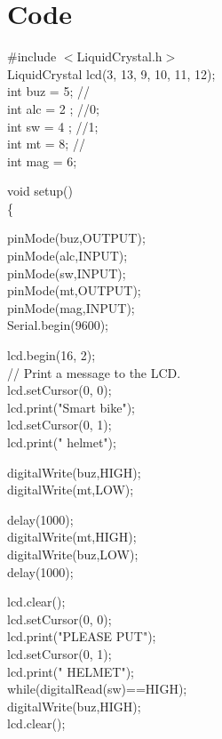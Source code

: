 \pagebreak
\section{Code}
\#include $<$LiquidCrystal.h$>$\\
LiquidCrystal lcd(3, 13, 9, 10, 11, 12);\\
int buz = 5;  // \\
int alc = 2 ; //0;\\
int sw =  4 ; //1;\\
int mt = 8;   //\\
int mag = 6;\\
\vspace{.3cm}

void setup()\\
\{ \vspace{.3cm}

pinMode(buz,OUTPUT);\\
pinMode(alc,INPUT);\\
pinMode(sw,INPUT);\\
pinMode(mt,OUTPUT);\\
pinMode(mag,INPUT);\\
Serial.begin(9600);\\
\vspace{.3cm}

lcd.begin(16, 2);\\
// Print a message to the LCD.\\
lcd.setCursor(0, 0);\\
lcd.print("Smart bike");\\
lcd.setCursor(0, 1);\\
lcd.print("   helmet");\\
\vspace{.6cm}


digitalWrite(buz,HIGH);\\
digitalWrite(mt,LOW);\\
\vspace{.3cm}

delay(1000);\\
digitalWrite(mt,HIGH);\\
digitalWrite(buz,LOW);\\
delay(1000);\\
\vspace{.3cm}

lcd.clear();\\
lcd.setCursor(0, 0);\\
lcd.print("PLEASE PUT");\\
lcd.setCursor(0, 1);\\
lcd.print(" HELMET");\\
while(digitalRead(sw)==HIGH);\\
digitalWrite(buz,HIGH);\\
lcd.clear();\\

